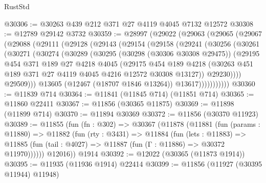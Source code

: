 \begin{lexlean}{RustStd}
\begin{coremodule}
@30306 := @30263 @439 @212 @371 @27 @4119 @4045 @7132 @12572
@30308 := @12789 @29142 @3732
@30359 := @28997
    (@29022
      (@29063
        (@29065
          (@29067
            (@29088
              (@29111
                (@29128
                  (@29143
                    (@29154
                      (@29158
                        (@29241
                          (@30256
                            (@30261
                              (@30271
                                (@30274
                                  (@30289
                                    (@30295
                                      (@30298 (@30306 @30308 @29475))
                                      (@29195
                                        @454
                                        @371
                                        @189
                                        @27
                                        @4218
                                        @4045
                                        (@29175
                                          @454
                                          @189
                                          @4218
                                          (@30263
                                            @451
                                            @189
                                            @371
                                            @27
                                            @4119
                                            @4045
                                            @4216
                                            @12572
                                            @30308
                                            @13127))
                                        @29230))))
                                @29509)))
                          @13605
                          (@12467 (@18707 @1846 @13264))
                          @13617)))))))))))
@30360 := @11839 @714
@30364 := @11841 (@11845 @714) (@11851 @714)
@30365 := @11860 @22411
@30367 := @11856 (@30365 @11875)
@30369 := @11898 (@11899 @714)
@30370 := @11894 @30369
@30372 := @11856 (@30370 @11923)
@30389 := @11855
    (fun (fn : @302) =>
    @30367
      (@11878
        (@11881
          (fun (params : @11880) =>
          @11882
            (fun (rty : @3431) =>
            @11884
              (fun (lets : @11883) =>
              @11885 (fun (tail : @4027) => @11887 (fun (Γ : @11886) => @30372 @11970))))))
        @12016))
    @1914
@30392 := @12022 (@30365 (@11873 @1914))
@30395 := @11935 (@11936 @1914) @22414
@30399 := @11856 (@11927 (@30395 @11944) @11948)

\end{coremodule}
\end{lexlean}

